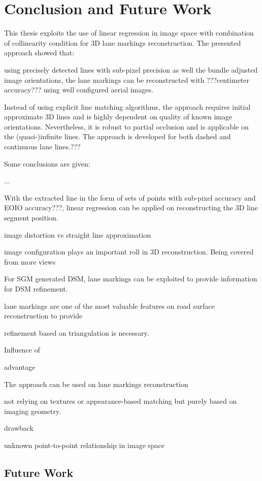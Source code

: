 
\chapter{Conclusion and Future Work}
\label{chap:conclusion}

This thesis exploits the use of linear regression in image space with combination of collinearity condition for 3D lane markings reconstruction. The presented approach showed that:

using precisely detected lines with sub-pixel precision as well the bundle adjusted image orientations, the lane markings can be reconstructed with ???centimeter accuracy??? using well configured aerial images.

Instead of using explicit line matching algorithms, the approach requires initial approximate 3D lines and is highly dependent on quality of known image orientations. Nevertheless, it is robust to partial occlusion and is applicable on the (quasi-)infinite lines. %
The approach is developed for both dashed and continuous lane lines.???




Some conclusions are given:

...


With the extracted line in the form of sets of points with sub-pixel accuracy and EOIO accuracy???, linear regression can be applied on reconstructing the 3D line segment position.

image distortion vs straight line approximation


image configuration plays an important roll in 3D reconstruction. Being covered from more views



For SGM generated DSM, lane markings can be exploited to provide information for DSM refinement. 

lane markings are one of the most valuable features on road surface reconstruction to provide 

 refinement based on triangulation is necessary.



Influence of 


advantage

The approach can be used on lane markings reconstruction

not relying on textures or appearance-based matching
but purely based on imaging geometry.

drawback

unknown point-to-point relationship in image space




\section*{Future Work}
\label{chap:futurework}




